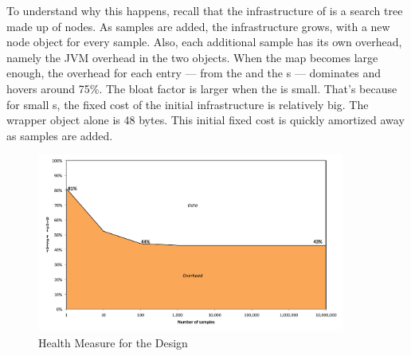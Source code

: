 
To understand why this happens, recall that the infrastructure of 
is a search tree made up of nodes. As
samples are added, the infrastructure grows, with a new node object for every
sample. Also, each additional sample has its own overhead, namely the JVM
overhead in the two  objects. When the map becomes large enough,
the overhead for each entry --- from the  and the
s --- dominates and hovers around 75\%.
The bloat factor is larger when the  is small. That's because for
small s, the fixed cost of the initial  infrastructure is
relatively big. The  wrapper object alone is 48 bytes. This
initial fixed cost is quickly amortized away as samples are added.


\begin{figure}
  \centering
   \includegraphics[width=0.9\textwidth]{part1/Figures/memoryhealth/scalable-health-arraylist}
  \caption{Health Measure for the  Design }
  \label{fig:scalable-health-arraylist}
\end{figure}

